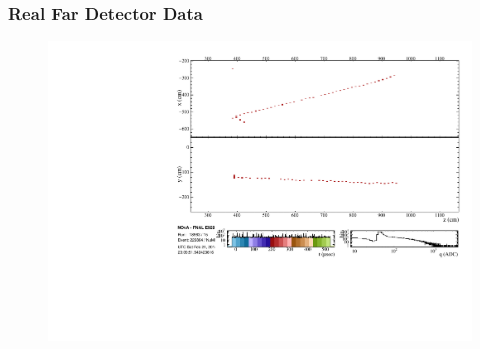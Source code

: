 \documentclass[10pt,professionalfonts,xcolor=table]{beamer}
\begin{document}
\frame
{
  \frametitle{Real Far Detector Data}

 \begin{figure} \includegraphics[height=0.85\textwidth, angle=-90]{figures/evd_steps/evd_oneslicehit.pdf} \end{figure}
  \centering \footnotesize $~$


}
\end{document}
